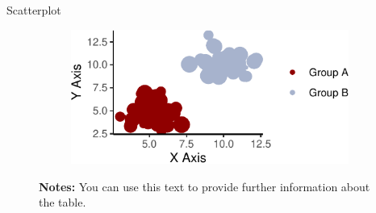 \documentclass[11pt, aspectratio=169, t]{beamer}
\begin{document}
\begin{frame}{Scatterplot}
\protect\hypertarget{scatterplot}{}
\begin{figure}

\caption{\label{fig-scatterplot}Two groups have very different values}

{\centering 

\begin{figure}[H]

{\centering \includegraphics{example_slides_files/figure-beamer/scatterplot-1.pdf}

}

\end{figure}

\hypertarget{fig-scatterplot-1}{}
\vspace{-5pt}
\begin{minipage}{0.9\textwidth}
\scriptsize
\singlespacing
\textbf{Notes:} You can use this text to provide further information about the table. \lipsum[66]
\end{minipage}
\vspace{15pt}

}

\end{figure}
\end{frame}
\end{document}

